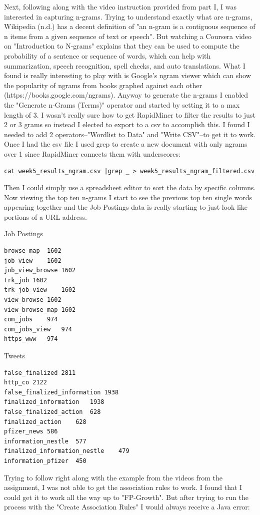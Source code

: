 \documentclass[10pt]{article}
\begin{document}
Next, following along with the video instruction provided from part I, I was interested in capturing n-grams. Trying to understand exactly what are n-grams, Wikipedia (n.d.) has a decent definition of "an n-gram is a contiguous sequence of n items from a given sequence of text or speech". But watching a Coursera video on "Introduction to N-grams" explains that they can be used to compute the probability of a sentence or sequence of words, which can help with summarization, speech recognition, spell checks, and auto translations. What I found is really interesting to play with is Google's ngram viewer which can show the popularity of ngrams from books graphed against each other (https://books.google.com/ngrams). Anyway to generate the n-grams I enabled the "Generate n-Grams (Terms)" operator and started by setting it to a max length of 3. I wasn't really sure how to get RapidMiner to filter the results to just 2 or 3 grams so instead I elected to export to a csv to accomplish this. I found I needed to add 2 operators--"Wordlist to Data" and "Write CSV"--to get it to work. Once I had the csv file I used grep to create a new document with only ngrams over 1 since RapidMiner connects them with underscores:
\begin{verbatim}
cat week5_results_ngram.csv |grep _ > week5_results_ngram_filtered.csv
\end{verbatim}
Then I could simply use a spreadsheet editor to sort the data by specific columns. Now viewing the top ten n-grams I start to see the previous top ten single words appearing together and the Job Postings data is really starting to just look like portions of a URL address. 
\pagebreak
\begin{multicols}{2}
Job Postings
\begin{verbatim}
browse_map	1602
job_view	1602
job_view_browse	1602
trk_job	1602
trk_job_view	1602
view_browse	1602
view_browse_map	1602
com_jobs	974
com_jobs_view	974
https_www	974
\end{verbatim}
Tweets
\begin{verbatim}
false_finalized	2811
http_co	2122
false_finalized_information	1938
finalized_information	1938
false_finalized_action	628
finalized_action	628
pfizer_news	586
information_nestle	577
finalized_information_nestle	479
information_pfizer	450
\end{verbatim}
\end{multicols}
Trying to follow right along with the example from the videos from the assignment, I was not able to get the association rules to work. I found that I could get it to work all the way up to "FP-Growth". But after trying to run the process with the "Create Association Rules" I would always receive a Java error:
\end{document}
